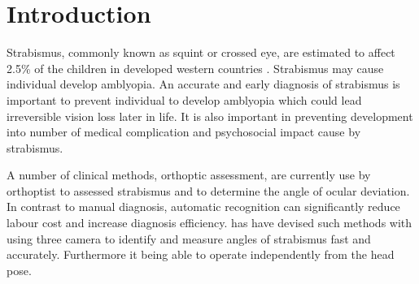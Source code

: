 \documentclass[12pt]{article}
\begin{document}

\section*{}

\printnomenclature
{}


\newpage


\tableofcontents
\listoffigures
\listoftables

\newpage



\section{Introduction}
Strabismus, commonly known as squint or crossed eye, are estimated to affect 2.5\% of the children in developed western countries \citep{Williams2008a,Torp-Pedersen2017}. Strabismus may cause individual develop amblyopia. An accurate and early diagnosis of strabismus is important to prevent individual to develop amblyopia which could lead irreversible vision loss later in life. It is also important in preventing development into number of medical complication and psychosocial impact cause by strabismus. 

A number of clinical methods, orthoptic assessment, are currently use by orthoptist to assessed strabismus and to determine the angle of ocular deviation. In contrast to manual diagnosis, automatic recognition can significantly reduce labour cost and increase diagnosis efficiency. \citet{Bakker2013, Chen2018} has have devised such methods with using three camera to identify and measure angles of strabismus fast and accurately. Furthermore it being able to operate independently from the head pose.
\end{document}
